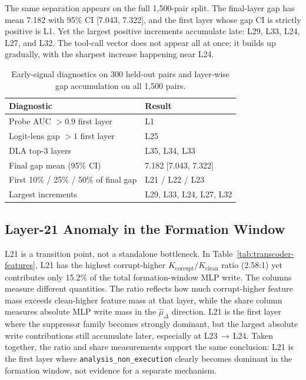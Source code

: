 The same separation appears on the full 1,500-pair split. The final-layer gap
has mean 7.182 with 95\% CI [7.043, 7.322], and the first layer whose gap CI
is strictly positive is L1. Yet the largest positive increments accumulate late: L29, L33, L24, L27, and
L32. The tool-call vector does not appear all at once; it builds up gradually,
with the sharpest increase happening near L24.

\begin{table}[t]
  \centering
  \small
  \caption{Early-signal diagnostics on 300 held-out pairs and layer-wise gap accumulation on all 1,500 pairs.}
  \label{tab:early-signal-triplet}
  \begin{tabular}{ll}
    \toprule
    Diagnostic & Result \\
    \midrule
    Probe AUC $> 0.9$ first layer & L1 \\
    Logit-lens gap $> 1$ first layer & L25 \\
    DLA top-3 layers & L35, L34, L33 \\
    Final gap mean (95\% CI) & 7.182 [7.043, 7.322] \\
    First 10\% / 25\% / 50\% of final gap & L21 / L22 / L23 \\
    Largest increments & L29, L33, L24, L27, L32 \\
    \bottomrule
  \end{tabular}
\end{table}

\subsection{Layer-21 Anomaly in the Formation Window}
L21 is a transition point, not a standalone bottleneck. In
Table~\ref{tab:transcoder-features}, L21 has the highest corrupt-higher
$K_{\mathrm{corrupt}}/K_{\mathrm{clean}}$ ratio (2.58:1) yet contributes only
15.2\% of the total formation-window MLP write. The columns measure different
quantities. The ratio reflects how much corrupt-higher feature mass exceeds
clean-higher feature mass at that layer, while the share column measures
absolute MLP write mass in the $\hat{\mu}_\Delta$ direction. L21 is the first
layer where the suppressor
family becomes strongly dominant, but the largest absolute write contributions
still accumulate later, especially at L23$\,\to\,$L24.
Taken together, the ratio and share measurements support the same conclusion:
L21 is the first layer where \texttt{analysis\_non\_execution} clearly becomes
dominant in the formation window, not evidence for a separate mechanism.

